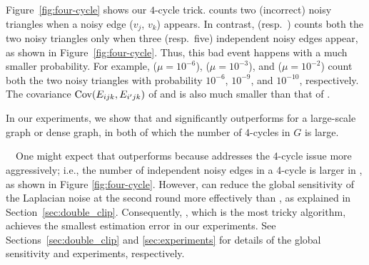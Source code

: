 Figure~\ref{fig:four-cycle} shows our $4$-cycle trick.
\AlgOne{} counts two (incorrect) noisy triangles when a noisy edge ($v_j$, $v_k$) appears.
In contrast,
\AlgTwo{} (resp.~\AlgThree{}) counts both the two noisy triangles
only when three (resp.~five) independent noisy edges appear,
as shown in Figure~\ref{fig:four-cycle}.
Thus, this bad event happens with a much smaller probability.
For example,
\AlgOne{} ($\mu=10^{-6}$),
\AlgTwo{} ($\mu=10^{-3}$), and
\AlgThree{} ($\mu=10^{-2}$)
count both the two noisy triangles with probability $10^{-6}$, $10^{-9}$, and $10^{-10}$, respectively.
The covariance $\operatorname{\text{Cov}}(E_{ijk},E_{i'jk})$ of \AlgTwo{} and \AlgThree{} is also much smaller than that of \AlgOne{}.


In our experiments, we show that \AlgTwo{} and \AlgThree{} significantly outperforms \AlgOne{}
for a large-scale graph or dense graph, in both of which
the number of 4-cycles in $G$ 
is 
large.

\smallskip
{}~~One
might expect that \AlgThree{} outperforms \AlgTwo{} because \AlgThree{} addresses the 4-cycle issue more aggressively; i.e.,
the number of independent noisy edges in a 4-cycle is larger in \AlgThree{},
as shown in Figure \ref{fig:four-cycle}.
However,
\AlgTwo{} can reduce the global sensitivity of the Laplacian noise
at the second round
more effectively than \AlgThree{}, as explained in Section~\ref{sec:double_clip}.
Consequently, \AlgTwo{}, which is the most tricky algorithm, achieves the smallest estimation error in our experiments.
See Sections~\ref{sec:double_clip} and \ref{sec:experiments} for details of the global sensitivity and experiments, respectively.

